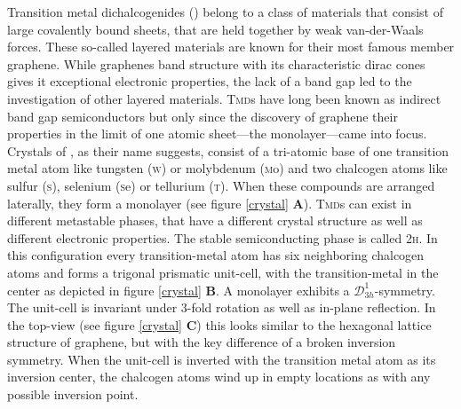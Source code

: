 Transition metal dichalcogenides (\tmds\!) belong to a class of materials that consist of large covalently bound sheets, that are held together by weak van-der-Waals forces. These so-called layered materials are known for their most famous member graphene. While graphenes band structure with its characteristic dirac cones gives it exceptional electronic properties, the lack of a band gap led to the investigation of other layered materials. \textsc{Tmd}s have long been known as indirect band gap semiconductors but only since the discovery of graphene their properties in the limit of one atomic sheet---the monolayer---came into focus. Crystals of \tmds, as their name suggests, consist of a tri-atomic base of one transition metal atom like tungsten (\textsc{w}) or molybdenum (\textsc{m}{\footnotesize o}) and two chalcogen atoms like sulfur (\textsc{s}), selenium (\textsc{s}{\footnotesize e}) or tellurium (\textsc{t}). When these compounds are arranged laterally, they form a \tmdg monolayer (see figure \ref{crystal} \textbf{A}). \textsc{Tmd}s can exist in different metastable phases, that have a different crystal structure as well as different electronic properties\cite{ouyang_phase_2015}. The stable semiconducting phase is called 2\textsc{h}. In this configuration every transition-metal atom has six neighboring chalcogen atoms and forms a trigonal prismatic unit-cell, with the transition-metal in the center as depicted in figure \ref{crystal} \textbf{B}. A \tmdg monolayer exhibits a $\mathcal{D}^1_{3h}$-symmetry. The unit-cell is invariant under 3-fold rotation as well as in-plane reflection. In the top-view (see figure \ref{crystal} \textbf{C}) this looks similar to the hexagonal lattice structure of graphene, but with the key difference of a broken inversion symmetry. When the unit-cell is inverted with the transition metal atom as its inversion center, the chalcogen atoms wind up in empty locations as with any possible inversion point.

